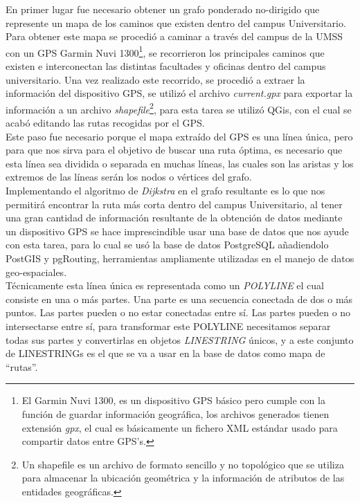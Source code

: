  En primer lugar fue necesario obtener un grafo ponderado no-dirigido que represente un mapa de los caminos que existen dentro del campus Universitario.\\

 Para obtener este mapa se procedió a caminar a través del campus de la UMSS con un GPS Garmin Nuvi 1300\footnote{El Garmin Nuvi 1300, es un dispositivo GPS básico pero cumple con la función de guardar información geográfica, los archivos generados tienen extensión \emph{gpx}, el cual es básicamente un fichero XML estándar usado para compartir datos entre GPS's.}, se recorrieron los principales caminos que existen e interconectan las distintas facultades y oficinas dentro del campus universitario. Una vez realizado este recorrido, se procedió a extraer la información del dispositivo GPS, se utilizó el archivo \emph{current.gpx} para exportar la información  a un archivo \emph{shapefile}\footnote{Un shapefile es un archivo de formato sencillo y no topológico que se utiliza para almacenar la ubicación geométrica y la información de atributos de las entidades geográficas.\cite{what_is_shapefile} }, para esta tarea se utilizó QGis, con el cual se acabó editando las rutas recogidas por el GPS.\\

 Este paso fue necesario porque el mapa extraído del GPS es una línea única, pero para que nos sirva para el objetivo de buscar una ruta óptima, es necesario que esta línea sea dividida o separada en muchas líneas, las cuales son las aristas y los extremos de las líneas serán los nodos o vértices del grafo.\\

 Implementando el algoritmo de \emph{Dijkstra} en el grafo resultante es lo que nos permitir\'a encontrar la ruta más corta dentro del campus Universitario, al tener una gran cantidad de información resultante de la obtención de datos mediante un dispositivo GPS se hace imprescindible usar una base de datos que nos ayude con esta tarea, para lo cual se usó la base de datos PostgreSQL añadiendolo PostGIS y pgRouting, herramientas ampliamente utilizadas en el manejo de datos geo-espaciales.\\



 Técnicamente esta línea única es representada como un \emph{POLYLINE} el cual consiste en una o más partes. Una parte es una secuencia conectada de dos o más puntos. Las partes pueden o no estar conectadas entre sí. Las partes pueden o no intersectarse entre sí, para transformar este POLYLINE necesitamos separar todas sus partes y convertirlas en objetos \emph{LINESTRING} únicos, y a este conjunto de LINESTRINGs es el que se va a usar en la base de datos como mapa de ``rutas''.\cite{esri_shapefile}\\

